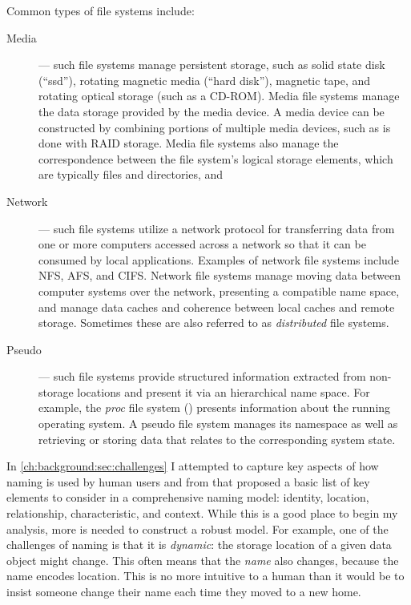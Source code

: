 Common types of file systems include:

\begin{description}
    \item[Media] --- such file systems manage persistent storage, such as solid
        state disk (``ssd''), rotating magnetic media (``hard disk''), magnetic
        tape, and rotating optical storage (such as a CD-ROM). Media file systems
        manage the data storage provided by the media device.  A media device can be
        constructed by combining portions of multiple media devices, such as is done
        with \ac{RAID} storage.  Media file systems also manage the correspondence
        between the file system's logical storage elements, which are typically files and
        directories, and

    \item[Network] --- such file systems utilize a network protocol for
        transferring data from one or more computers accessed across a network so
        that it can be consumed by local applications.  Examples of network file
        systems include \ac{NFS}, \ac{AFS}, and \ac{CIFS}. Network file systems
        manage moving data between computer systems over the network, presenting a
        compatible name space, and manage data caches and coherence between local
        caches and remote storage.  Sometimes these are also referred to as
        \emph{distributed} file systems.

    \item[Pseudo] --- such file systems provide structured information extracted
        from non-storage locations and present it via an hierarchical name
        space.  For example, the \emph{proc} file system ()
        presents information about the running operating system.  A pseudo file
        system manages its namespace as well as retrieving or storing data that
        relates to the corresponding system state.

\end{description}






In \autoref{ch:background:sec:challenges} I attempted to capture key aspects
of how naming is used by human users and from that proposed a basic list of key
elements to consider in a comprehensive naming model: identity, location,
relationship, characteristic, and context.  While this is a good place to begin
my analysis, more is needed to construct a robust model.  For example, one of the
challenges of naming is that it is \emph{dynamic}: the storage
location of a given data object might change.  This often means that the
\emph{name} also changes, because the name encodes location.  This is no more
intuitive to a human than it would be to insist someone change their name each
time they moved to a new home.

